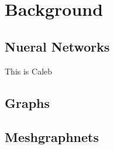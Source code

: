 \section{Background}
\subsection{Nueral Networks}
This is Caleb
\subsection{Graphs}

\subsection{Meshgraphnets}
